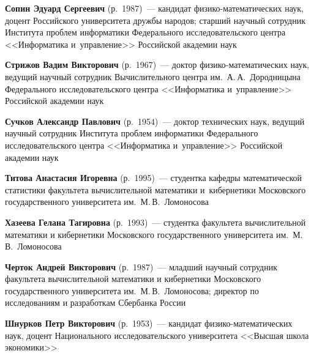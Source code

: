 \begin{multicols}{2}
\vspace*{3pt}

\noindent
\textbf{Сопин Эдуард Сергеевич} (р.\ 1987)~---
 кандидат фи\-зи\-ко-ма\-те\-ма\-ти\-че\-ских наук, доцент Российского университета 
 дружбы народов; старший научный сотруд\-ник Института проб\-лем 
 информатики Федерального исследовательского центра <<Информатика и~управ\-ле\-ние>> 
 Российской академии наук

\vspace*{3pt}

\noindent
\textbf{Стрижов Вадим Викторович} (р.\ 1967)~--- доктор фи\-зи\-ко-ма\-те\-ма\-ти\-че\-ских наук, 
ведущий научный сотрудник Вычислительного центра им.\ А.\,А.~Дородницына 
Федерального исследовательского центра <<Информатика и~управ\-ле\-ние>> 
Российской академии наук

\vspace*{3pt}

\noindent
\textbf{Сучков Александр Павлович} (р.\ 1954)~--- 
доктор технических наук, ведущий научный сотрудник Института проб\-лем 
информатики Федерального исследователь\-ского центра <<Информатика и~управ\-ле\-ние>> 
Российской академии наук

\vspace*{3pt}

\noindent
\textbf{Титова Анастасия Игоревна} (р.\ 1995)~--- студентка
кафед\-ры математической 
статистики факультета вычислительной математики и~кибернетики Московского 
государственного университета им.\ М.\,В.~Ломоносова 

\vspace*{3pt}

\noindent
\textbf{Хазеева Гелана Тагировна} (р.\ 1993)~---
 студентка факультета вычислительной математики и кибернетики Московского 
 государственного университета им.\ М.\,В.~Ломоносова

\vspace*{3pt}

\noindent
\textbf{Черток Андрей Викторович} (р.\ 1987)~--- 
младший научный сотрудник факультета вычислительной математики и кибернетики 
Московского государственного университета им.\ М.\,В.~Ломоносова; директор по 
исследованиям и разработкам Сбербанка России 

\vspace*{3pt}

\noindent
\textbf{Шнурков Петр Викторович} (р.\ 1953)~---
кандидат фи\-зи\-ко-ма\-те\-ма\-ти\-че\-ских наук, доцент Национального 
исследовательского университета <<Высшая школа экономики>>


\end{multicols}
